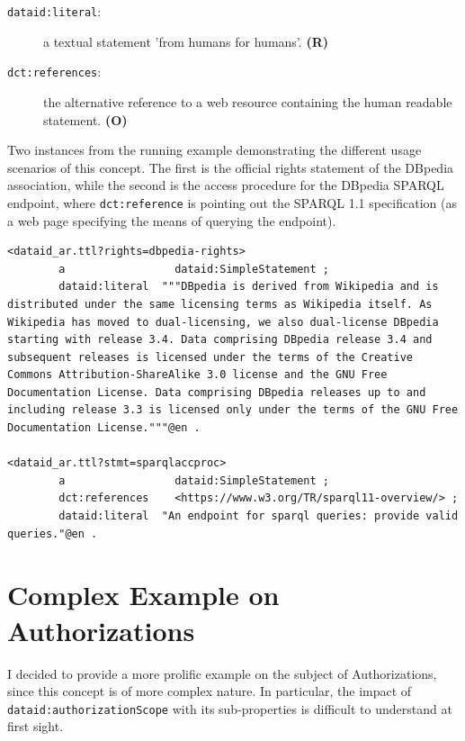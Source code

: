 \documentclass[a4paper,english,twoside,BCOR1.5cm,headsepline,DIV12,appendixprefix,final,12pt]{scrbook}
\newcommand{\prop}[1]{{{\texttt{#1}}}}
\begin{document}
\begin{description}
\item[\prop{dataid:literal}:] a textual statement 'from humans for humans'. \textbf{(R)}
\item[\prop{dct:references}:] the alternative reference to a web resource containing the human readable statement. \textbf{(O)}
\end{description}

Two instances from the running example demonstrating the different usage scenarios of this concept. The first is the official rights statement of the DBpedia association, while the second is the access procedure for the DBpedia SPARQL endpoint, where \prop{dct:reference} is pointing out the SPARQL 1.1 specification (as a web page specifying the means of querying the endpoint).
\\
\begin{lstlisting}[language=ttl, captionpos=b,caption=Example of an organisation,label=lst:coresuperset,linewidth=\columnwidth,breaklines=true]
<dataid_ar.ttl?rights=dbpedia-rights>
        a                 dataid:SimpleStatement ;                                            
        dataid:literal  """DBpedia is derived from Wikipedia and is distributed under the same licensing terms as Wikipedia itself. As Wikipedia has moved to dual-licensing, we also dual-license DBpedia starting with release 3.4. Data comprising DBpedia release 3.4 and subsequent releases is licensed under the terms of the Creative Commons Attribution-ShareAlike 3.0 license and the GNU Free Documentation License. Data comprising DBpedia releases up to and including release 3.3 is licensed only under the terms of the GNU Free Documentation License."""@en .

<dataid_ar.ttl?stmt=sparqlaccproc>
        a                 dataid:SimpleStatement ;                                            
        dct:references    <https://www.w3.org/TR/sparql11-overview/> ;                        
        dataid:literal  "An endpoint for sparql queries: provide valid queries."@en .
\end{lstlisting}

\section{Complex Example on Authorizations} 
\label{sec:exauthorization}

I decided to provide a more prolific example on the subject of Authorizations, since this concept is of more complex nature. In particular, the impact of \prop{dataid:authorizationScope} with its sub-properties is difficult to understand at first sight.
\end{document}
